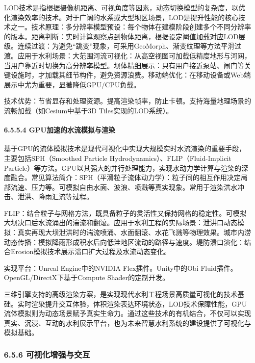 LOD技术是指根据摄像机距离、可视角度等因素，动态切换模型的复杂度，以优化渲染效率的技术。对于广阔的水系或大型坝区场景，LOD是提升性能的核心技术之一。技术原理：多分辨率模型预设：每个物体在建模阶段创建多个不同分辨率的版本。距离判断：实时计算观察点到物体距离，根据设定阈值加载对应LOD层级。连续过渡：为避免``跳变''现象，可采用GeoMorph、渐变纹理等方法平滑过渡。应用于水利场景：大范围河流可视化：从高空视图可加载低精度地形与河网，当用户靠近时切换为高分辨率模型。坝体精细展示：只有用户接近泵站、闸门等关键设施时，才加载其细节构件，避免资源浪费。移动端优化：在移动设备或Web端展示中尤为重要，显著降低GPU/CPU负载。

技术优势：节省显存和处理资源。提高渲染帧率，防止卡顿。支持海量地理场景的流畅加载（如Cesium中基于3D Tiles实现的LOD系统）。

\paragraph{6.5.5.4 GPU加速的水流模拟与渲染}\label{gpuux52a0ux901fux7684ux6c34ux6d41ux6a21ux62dfux4e0eux6e32ux67d3}

基于GPU的流体模拟技术是现代可视化中实现大规模实时水流渲染的重要手段，主要包括SPH（Smoothed Particle Hydrodynamics）、FLIP（Fluid-Implicit Particle）等方法。GPU以其强大的并行处理能力，实现水动力学计算与渲染的深度融合。常见算法简介：SPH（平滑粒子流体动力学）：粒子间的相互作用决定局部流速、压力等。可模拟自由水面、波浪、喷溅等真实现象。常用于渲染洪水冲击、泄洪、降雨汇流等过程。

FLIP：结合粒子与网格方法，既具备粒子的灵活性又保持网格的稳定性。可模拟大坝决口后水流涌出的湍流和翻滚。应用于水利工程的实际场景：泄洪口动态模拟：真实再现大坝泄洪时的湍流喷涌、水面翻滚、水花飞溅等物理效果。城市内涝动态传播：模拟降雨形成积水后向低洼地区流动的路径与速度。堤防溃口演化：结合Erosion模拟技术展示溃口扩大过程及水流动态变化。

实现平台：Unreal Engine中的NVIDIA Flex插件。Unity中的Obi Fluid插件。OpenGL/DirectX下基于Compute Shader的定制开发。

三维引擎支持的高级渲染方案，是实现现代水利工程场景高质量可视化的技术基础。实时渲染提升交互体验，体积渲染表达环境状态，LOD技术保障性能，GPU流体模拟则为动态场景赋予真实生命力。通过这些技术的有机结合，不仅可以实现真实、沉浸、互动的水利展示平台，也为未来智慧水利系统的建设提供了可视化与模拟基础。

\subsubsection{6.5.6 可视化增强与交互}\label{ux53efux89c6ux5316ux589eux5f3aux4e0eux4ea4ux4e92}

